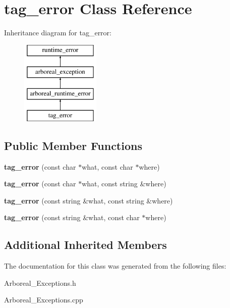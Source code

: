 \hypertarget{classtag__error}{}\section{tag\+\_\+error Class Reference}
\label{classtag__error}
Inheritance diagram for tag\+\_\+error\+:\begin{figure}[H]
\begin{center}
\leavevmode
\includegraphics[height=4.000000cm]{classtag__error}
\end{center}
\end{figure}
\subsection*{Public Member Functions}
\begin{DoxyCompactItemize}
\item 
\mbox{\label{classtag__error_a4b5b0b99428cd336f5055ebffe948264}} 
{\bfseries tag\+\_\+error} (const char $\ast$what, const char $\ast$where)
\item 
\mbox{\label{classtag__error_ae7555051a3448b2e7adb1579985f820b}} 
{\bfseries tag\+\_\+error} (const char $\ast$what, const string \&where)
\item 
\mbox{\label{classtag__error_a145a30992b2b0bb2f675bea4a0a6b9b9}} 
{\bfseries tag\+\_\+error} (const string \&what, const string \&where)
\item 
\mbox{\label{classtag__error_a9514ff946e2998b5914dd38c27b1aef5}} 
{\bfseries tag\+\_\+error} (const string \&what, const char $\ast$where)
\end{DoxyCompactItemize}
\subsection*{Additional Inherited Members}


The documentation for this class was generated from the following files\+:\begin{DoxyCompactItemize}
\item 
Arboreal\+\_\+\+Exceptions.\+h\item 
Arboreal\+\_\+\+Exceptions.\+cpp\end{DoxyCompactItemize}
